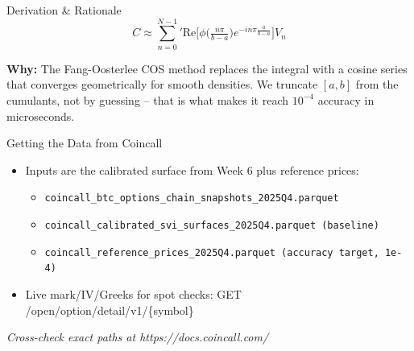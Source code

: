 \documentclass[aspectratio=169,10pt]{beamer}
\begin{document}
\begin{frame}{Derivation \& Rationale}
\[C \approx \sum_{n=0}^{N-1}{}' \mathrm{Re}\!\Big[\phi\!\big(\tfrac{n\pi}{b-a}\big)e^{-i n\pi\frac{a}{b-a}}\Big]V_n\]

\small\textbf{\color{ncsured}Why:} The Fang-Oosterlee COS method replaces the integral with a cosine series that converges geometrically for smooth densities. We truncate $[a,b]$ from the cumulants, not by guessing -- that is what makes it reach $10^{-4}$ accuracy in microseconds.
\end{frame}

\begin{frame}{Getting the Data from Coincall}
\begin{itemize}
  \item Inputs are the calibrated surface from Week 6 plus reference prices:
  \begin{itemize}\item \texttt{\small coincall\_btc\_options\_chain\_snapshots\_2025Q4.parquet}\end{itemize}
  \begin{itemize}\item \texttt{\small coincall\_calibrated\_svi\_surfaces\_2025Q4.parquet (baseline)}\end{itemize}
  \begin{itemize}\item \texttt{\small coincall\_reference\_prices\_2025Q4.parquet (accuracy target, 1e-4)}\end{itemize}
  \item Live mark/IV/Greeks for spot checks: GET /open/option/detail/v1/\{symbol\}
\end{itemize}
\vspace{2pt}\tiny\textit{Cross-check exact paths at https://docs.coincall.com/}
\end{frame}
\end{document}
